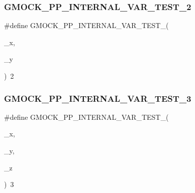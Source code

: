 \subsubsection{\texorpdfstring{GMOCK\_PP\_INTERNAL\_VAR\_TEST\_2}{GMOCK\_PP\_INTERNAL\_VAR\_TEST\_2}}
{\footnotesize\ttfamily \#define G\+M\+O\+C\+K\+\_\+\+P\+P\+\_\+\+I\+N\+T\+E\+R\+N\+A\+L\+\_\+\+V\+A\+R\+\_\+\+T\+E\+S\+T\+\_(\begin{DoxyParamCaption}\item[{}]{\+\_\+x,  }\item[{}]{\+\_\+y }\end{DoxyParamCaption})~2}

\mbox{\label{_obj__test_2lib_2googletest-master_2googlemock_2test_2gmock-pp__test_8cc_aea89cca718bf036fc3f1b10ab67019fb}} 
\subsubsection{\texorpdfstring{GMOCK\_PP\_INTERNAL\_VAR\_TEST\_3}{GMOCK\_PP\_INTERNAL\_VAR\_TEST\_3}}
{\footnotesize\ttfamily \#define G\+M\+O\+C\+K\+\_\+\+P\+P\+\_\+\+I\+N\+T\+E\+R\+N\+A\+L\+\_\+\+V\+A\+R\+\_\+\+T\+E\+S\+T\+\_(\begin{DoxyParamCaption}\item[{}]{\+\_\+x,  }\item[{}]{\+\_\+y,  }\item[{}]{\+\_\+z }\end{DoxyParamCaption})~3}

